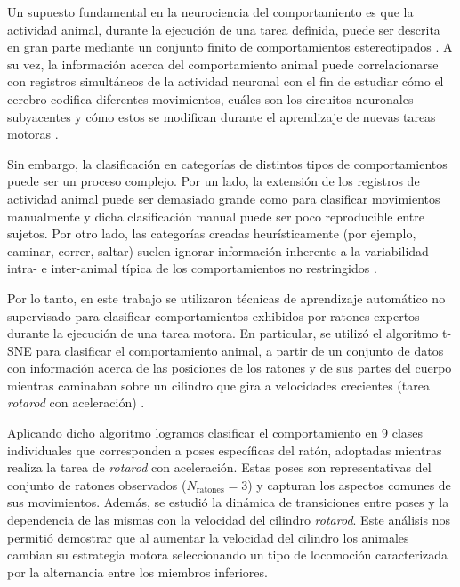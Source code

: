\begin{resumen}
Un supuesto fundamental en la neurociencia del comportamiento es que la actividad animal, durante la ejecución de una tarea definida, puede ser descrita en gran parte mediante un conjunto finito de comportamientos estereotipados \cite{berman_mapping}. A su vez, la información acerca del comportamiento animal puede correlacionarse con registros simultáneos de la actividad neuronal con el fin de estudiar cómo el cerebro codifica diferentes movimientos, cuáles son los circuitos neuronales subyacentes y cómo estos se modifican durante el aprendizaje de nuevas tareas motoras \cite{esposito_defensive,levy_representation}.

Sin embargo, la clasificación en categorías de distintos tipos de comportamientos puede ser un proceso complejo. Por un lado, la extensión de los registros de actividad animal puede ser demasiado grande como para clasificar movimientos manualmente y dicha clasificación manual puede ser poco reproducible entre sujetos. Por otro lado, las categorías creadas heurísticamente (por ejemplo, caminar, correr, saltar) suelen ignorar información inherente a la variabilidad intra- e inter-animal típica de los comportamientos no restringidos \cite{berman_mapping}.

Por lo tanto, en este trabajo se utilizaron técnicas de aprendizaje automático no supervisado para clasificar comportamientos exhibidos por ratones expertos durante la ejecución de una tarea motora. En particular, se utilizó el algoritmo t-SNE para clasificar el comportamiento animal, a partir de un conjunto de datos con información acerca de las posiciones de los ratones y de sus partes del cuerpo mientras caminaban sobre un cilindro que gira a velocidades crecientes (tarea \textit{rotarod} con aceleración) \cite{berman_mapping,vdm_tsne,esposito_rotarod}.

Aplicando dicho algoritmo logramos clasificar el comportamiento en 9 clases individuales que corresponden a poses específicas del ratón, adoptadas mientras realiza la tarea de \textit{rotarod} con aceleración. Estas poses son representativas del conjunto de ratones observados ($N_{\mathrm{ratones}}=3$) y capturan los aspectos comunes de sus movimientos. Además, se estudió la dinámica de transiciones entre poses y la dependencia de las mismas con la velocidad del cilindro \textit{rotarod}. Este análisis nos permitió demostrar que al aumentar la velocidad del cilindro los animales cambian su estrategia motora seleccionando un tipo de locomoción caracterizada por la alternancia entre los miembros inferiores.


\end{resumen}
